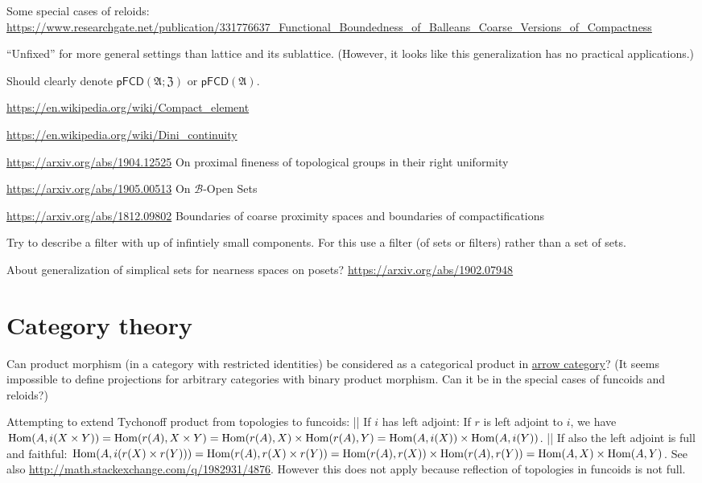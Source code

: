 \documentclass{amsart}
\begin{document}
Some special cases of reloids:
\url{https://www.researchgate.net/publication/331776637_Functional_Boundedness_of_Balleans_Coarse_Versions_of_Compactness}

``Unfixed'' for more general settings than lattice and its
sublattice. (However, it looks like this generalization has
no practical applications.)

Should clearly denote $\mathsf{pFCD}(\mathfrak{A};\mathfrak{Z})$ or $\mathsf{pFCD}(\mathfrak{A})$.

\url{https://en.wikipedia.org/wiki/Compact_element}

\url{https://en.wikipedia.org/wiki/Dini_continuity}

\url{https://arxiv.org/abs/1904.12525} On proximal fineness of topological groups in their right uniformity

\url{https://arxiv.org/abs/1905.00513}
On $\mathcal{B}$-Open Sets

\url{https://arxiv.org/abs/1812.09802} Boundaries of coarse proximity spaces and boundaries of compactifications

Try to describe a filter with up of infintiely small
components.
For this use a filter (of sets or filters) rather than a set
of sets.

About generalization of simplical sets for nearness spaces on posets?
\url{https://arxiv.org/abs/1902.07948}

\section{Category theory}

Can product morphism (in a category with restricted
identities) be considered as a categorical product
in \href{https://en.wikipedia.org/wiki/Comma_category#Arrow_category}{arrow category}?
(It seems impossible to define projections for
arbitrary categories with binary product morphism.
Can it be in the special cases of funcoids and reloids?)

Attempting to extend Tychonoff product from topologies to funcoids:
|| If $i$ has left adjoint:
If $r$ is left adjoint to $i$, we have $\operatorname{Hom}(A, i(X\times Y)) = \operatorname{Hom}(r(A), X\times Y) = \operatorname{Hom}(r(A), X)\times \operatorname{Hom}(r(A), Y) = \operatorname{Hom}(A, i(X))\times \operatorname{Hom}(A, i(Y))$.
|| If also the left adjoint is full and faithful:
$\operatorname{Hom}(A, i(r(X)\times r(Y))) = \operatorname{Hom}(r(A), r(X)\times r(Y)) = \operatorname{Hom}(r(A), r(X))\times \operatorname{Hom}(r(A), r(Y)) = \operatorname{Hom}(A, X)\times \operatorname{Hom}(A, Y)$.
See also \url{http://math.stackexchange.com/q/1982931/4876}. However this does not apply because reflection of topologies in funcoids
is not full.
\end{document}

